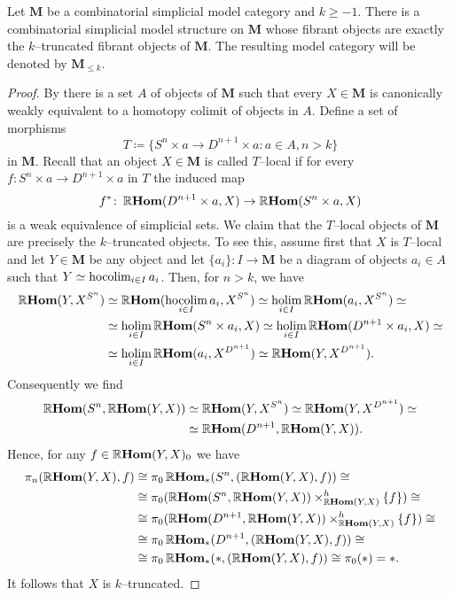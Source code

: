 \begin{theorem}\label{thm:truncated-model-structure-exists}
  Let \(\mathbf{M}\) be a combinatorial simplicial model category and
  \(k\geq -1\). There is a combinatorial simplicial model structure on
  \(\mathbf{M}\) whose fibrant objects are exactly the
  \(k\)--truncated fibrant objects of \(\mathbf{M}\). The resulting
  model category will be denoted by \(\mathbf{M}_{\leq k}\).
\end{theorem}
\begin{proof}
  By \cite[Prop.~4.7]{mr1870516} there is a set \(A\) of objects of
  \(\mathbf{M}\) such that every \(X\in\mathbf{M}\) is canonically
  weakly equivalent to a homotopy colimit of objects in \(A\). Define
  a set of morphisms
  \[
  T \coloneqq \{S^{n}\times a \to D^{n+1}\times a : a\in A, n > k \}
  \]
  in \(\mathbf{M}\). Recall that an object \(X\in\mathbf{M}\) is
  called \(T\)--local if for every \(f\colon S^{n}\times a\to
  D^{n+1}\times a\) in \(T\) the induced map
  \[
  f^{*}\colon \RHom(D^{n+1}\times a, X)\to\RHom(S^{n}\times a, X)
  \]
  is a weak equivalence of simplicial sets. We claim that the
  \(T\)--local objects of \(\mathbf{M}\) are precisely the
  \(k\)--truncated objects. To see this, assume first that \(X\) is
  \(T\)--local and let \(Y\in\mathbf{M}\) be any object and let
  \(\{a_{i}\}\colon I\to\mathbf{M}\) be a diagram of objects
  \(a_{i}\in A\) such that \(Y\simeq \hocolim_{i\in I} a_{i}\). Then,
  for \(n>k\), we have
  \begin{align*}
    \RHom(Y, X^{S^{n}}) &\simeq \RHom(\hocolim_{i\in I}a_{i}, X^{S^{n}})\simeq \holim_{i\in I}\RHom(a_{i}, X^{S^{n}}) \simeq \\
                        &\simeq \holim_{i\in I} \RHom(S^{n}\times a_{i}, X) \simeq \holim_{i\in I}\RHom(D^{n+1}\times a_{i}, X)\simeq \\
                        &\simeq \holim_{i\in I}\RHom(a_{i}, X^{D^{n+1}})\simeq \RHom(Y, X^{D^{n+1}}).
  \end{align*}
  Consequently we find
  \begin{align*}
    \RHom(S^{n}, \RHom(Y, X)) & \simeq \RHom(Y, X^{S^{n}}) \simeq \RHom(Y, X^{D^{n+1}}) \simeq\\
                              &\simeq \RHom(D^{n+1}, \RHom(Y, X)).
  \end{align*}
  Hence, for any \(f\in\RHom(Y,X)_{0}\) we have
  \begin{align*}
    \pi_{n}(\RHom(Y, X), f) &\cong \pi_{0}\RHom_{*}(S^{n}, (\RHom(Y,X), f)) \cong \\
                            &\cong \pi_{0}(\RHom(S^{n}, \RHom(Y,X))\times^{h}_{\RHom(Y,X)}\{f\}) \cong \\
                            &\cong \pi_{0}(\RHom(D^{n+1}, \RHom(Y,X))\times^{h}_{\RHom(Y,X)}\{f\}) \cong \\
                            &\cong \pi_{0}\RHom_{*}(D^{n+1}, (\RHom(Y,X), f)) \cong \\
                            &\cong \pi_{0}\RHom_{*}(*, (\RHom(Y,X), f)) \cong \pi_{0}(*) = *.
  \end{align*}
  It follows that \(X\) is \(k\)--truncated.


\end{proof}
